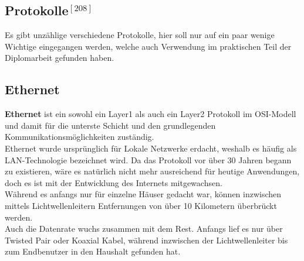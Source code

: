 \documentclass[12pt,a4paper]{report}
\begin{document}
\begin{onehalfspace}
\section*{Protokolle$^{[208]}$}
Es gibt unzählige verschiedene Protokolle, hier soll nur auf ein paar wenige Wichtige eingegangen werden, welche auch Verwendung im praktischen Teil der Diplomarbeit gefunden haben.
\subsection{Ethernet}\label{ssec:eth}
\textbf{Ethernet} ist ein sowohl ein Layer1 als auch ein Layer2 Protokoll im OSI-Modell und damit für die unterste Schicht und den grundlegenden Kommunikationsmöglichkeiten zuständig.\\

Ethernet wurde ursprünglich für Lokale Netzwerke erdacht, weshalb es häufig als LAN-Technologie bezeichnet wird. Da das Protokoll vor über 30 Jahren begann zu existieren, wäre es natürlich nicht mehr ausreichend für heutige Anwendungen, doch es ist mit der Entwicklung des Internets mitgewachsen.\\
Während es anfangs nur für einzelne Häuser gedacht war, können inzwischen mittels Lichtwellenleitern Entfernungen von über 10 Kilometern überbrückt werden.\\

Auch die Datenrate wuchs zusammen mit dem Rest. Anfangs lief es nur über Twisted Pair oder Koaxial Kabel, während inzwischen der Lichtwellenleiter bis zum Endbenutzer in den Haushalt gefunden hat.\\


\end{onehalfspace}
\end{document}
